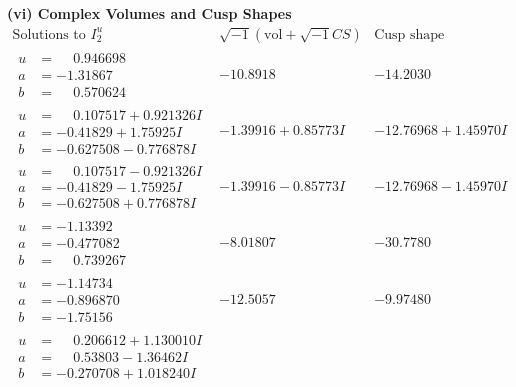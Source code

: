 \documentclass[1p]{elsarticle_modified}
\theoremstyle{definition}
\newcommand{\I}{\sqrt{-1}}
\begin{document}
\newpage\flushleft \textbf{(vi) Complex Volumes and Cusp Shapes}
$$\begin{array}{c|c|c}  
\text{Solutions to }I^u_{2}& \I (\text{vol} + \sqrt{-1}CS) & \text{Cusp shape}\\
 \hline 
\begin{aligned}
u &= \phantom{-}0.946698\phantom{ +0.000000I} \\
a &= -1.31867\phantom{ +0.000000I} \\
b &= \phantom{-}0.570624\phantom{ +0.000000I}\end{aligned}
 & -10.8918\phantom{ +0.000000I} & -14.2030\phantom{ +0.000000I} \\ \hline\begin{aligned}
u &= \phantom{-}0.107517 + 0.921326 I \\
a &= -0.41829 + 1.75925 I \\
b &= -0.627508 - 0.776878 I\end{aligned}
 & -1.39916 + 0.85773 I & -12.76968 + 1.45970 I \\ \hline\begin{aligned}
u &= \phantom{-}0.107517 - 0.921326 I \\
a &= -0.41829 - 1.75925 I \\
b &= -0.627508 + 0.776878 I\end{aligned}
 & -1.39916 - 0.85773 I & -12.76968 - 1.45970 I \\ \hline\begin{aligned}
u &= -1.13392\phantom{ +0.000000I} \\
a &= -0.477082\phantom{ +0.000000I} \\
b &= \phantom{-}0.739267\phantom{ +0.000000I}\end{aligned}
 & -8.01807\phantom{ +0.000000I} & -30.7780\phantom{ +0.000000I} \\ \hline\begin{aligned}
u &= -1.14734\phantom{ +0.000000I} \\
a &= -0.896870\phantom{ +0.000000I} \\
b &= -1.75156\phantom{ +0.000000I}\end{aligned}
 & -12.5057\phantom{ +0.000000I} & -9.97480\phantom{ +0.000000I} \\ \hline\begin{aligned}
u &= \phantom{-}0.206612 + 1.130010 I \\
a &= \phantom{-}0.53803 - 1.36462 I \\
b &= -0.270708 + 1.018240 I\end{aligned}

\end{array}$$
\end{document}
